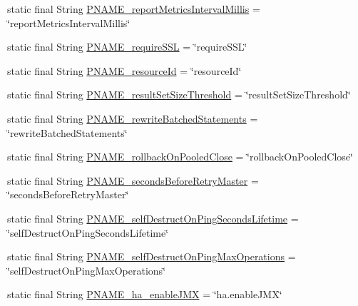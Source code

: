 \begin{DoxyCompactItemize}
\item 
static final String \mbox{\hyperlink{classcom_1_1mysql_1_1cj_1_1conf_1_1_property_definitions_a08d16a9058163b48d0cd59e7133aba4e}{P\+N\+A\+M\+E\+\_\+report\+Metrics\+Interval\+Millis}} = \char`\"{}report\+Metrics\+Interval\+Millis\char`\"{}
\item 
static final String \mbox{\hyperlink{classcom_1_1mysql_1_1cj_1_1conf_1_1_property_definitions_a944dbc4264f792eae85bad907abd0391}{P\+N\+A\+M\+E\+\_\+require\+S\+SL}} = \char`\"{}require\+S\+SL\char`\"{}
\item 
static final String \mbox{\hyperlink{classcom_1_1mysql_1_1cj_1_1conf_1_1_property_definitions_a6db83fe49d225de9f03923cb5979d12b}{P\+N\+A\+M\+E\+\_\+resource\+Id}} = \char`\"{}resource\+Id\char`\"{}
\item 
static final String \mbox{\hyperlink{classcom_1_1mysql_1_1cj_1_1conf_1_1_property_definitions_afd6c1c80b2ff8c652b66d8996dd8b389}{P\+N\+A\+M\+E\+\_\+result\+Set\+Size\+Threshold}} = \char`\"{}result\+Set\+Size\+Threshold\char`\"{}
\item 
static final String \mbox{\hyperlink{classcom_1_1mysql_1_1cj_1_1conf_1_1_property_definitions_ab147a707fcf16a9bc6f0b2703e4c6796}{P\+N\+A\+M\+E\+\_\+rewrite\+Batched\+Statements}} = \char`\"{}rewrite\+Batched\+Statements\char`\"{}
\item 
static final String \mbox{\hyperlink{classcom_1_1mysql_1_1cj_1_1conf_1_1_property_definitions_a79f501381612dd32518160ae5afa3622}{P\+N\+A\+M\+E\+\_\+rollback\+On\+Pooled\+Close}} = \char`\"{}rollback\+On\+Pooled\+Close\char`\"{}
\item 
static final String \mbox{\hyperlink{classcom_1_1mysql_1_1cj_1_1conf_1_1_property_definitions_aac73129ea13b089870b3c8bffeec1d4d}{P\+N\+A\+M\+E\+\_\+seconds\+Before\+Retry\+Master}} = \char`\"{}seconds\+Before\+Retry\+Master\char`\"{}
\item 
static final String \mbox{\hyperlink{classcom_1_1mysql_1_1cj_1_1conf_1_1_property_definitions_aba2a0c7a030119f2fe3066dd30ecefd5}{P\+N\+A\+M\+E\+\_\+self\+Destruct\+On\+Ping\+Seconds\+Lifetime}} = \char`\"{}self\+Destruct\+On\+Ping\+Seconds\+Lifetime\char`\"{}
\item 
static final String \mbox{\hyperlink{classcom_1_1mysql_1_1cj_1_1conf_1_1_property_definitions_a75d1b9ca970311e0fab34d31576c8d1f}{P\+N\+A\+M\+E\+\_\+self\+Destruct\+On\+Ping\+Max\+Operations}} = \char`\"{}self\+Destruct\+On\+Ping\+Max\+Operations\char`\"{}
\item 
static final String \mbox{\hyperlink{classcom_1_1mysql_1_1cj_1_1conf_1_1_property_definitions_a2920346257a2623344f9951c68824e8b}{P\+N\+A\+M\+E\+\_\+ha\+\_\+enable\+J\+MX}} = \char`\"{}ha.\+enable\+J\+MX\char`\"{}

\end{DoxyCompactItemize}
